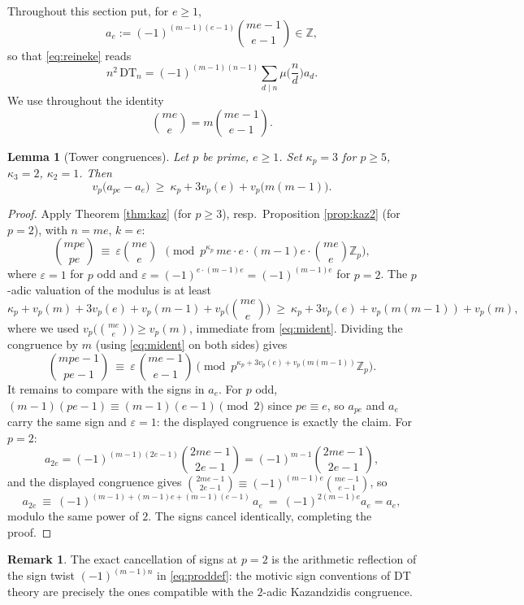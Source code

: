 \documentclass[11pt]{amsart}
\newtheorem{lemma}[theorem]{Lemma}
\theoremstyle{definition}
\newtheorem{remark}[theorem]{Remark}
\newcommand{\ZZ}{\mathbb{Z}}
\newcommand{\DT}{\mathrm{DT}}
\newcommand{\vp}{v_p}
\begin{document}
Throughout this section put, for $e\ge1$,
\[
a_e:=(-1)^{(m-1)(e-1)}\binom{me-1}{e-1}\in\ZZ,
\]
so that \eqref{eq:reineke} reads
\begin{equation}\label{eq:reineke2}
n^2\,\DT_n=(-1)^{(m-1)(n-1)}\sum_{d\mid n}\mu\Big(\frac nd\Big)a_d .
\end{equation}
We use throughout the identity
\begin{equation}\label{eq:mident}
\binom{me}{e}=m\binom{me-1}{e-1}.
\end{equation}

\begin{lemma}[Tower congruences]\label{lem:tower}
Let $p$ be prime, $e\ge1$. Set $\kappa_p=3$ for $p\ge5$, $\kappa_3=2$, $\kappa_2=1$. Then
\[
\vp\big(a_{pe}-a_e\big)\ \ge\ \kappa_p+3\vp(e)+\vp\big(m(m-1)\big).
\]
\end{lemma}

\begin{proof}
Apply Theorem \ref{thm:kaz} (for $p\ge3$), resp.\ Proposition \ref{prop:kaz2} (for $p=2$), with $n=me$, $k=e$:
\[
\binom{mpe}{pe}\ \equiv\ \varepsilon\binom{me}{e}\ \ \pmod{p^{\kappa_p}\,me\cdot e\cdot(m-1)e\cdot\binom{me}{e}\ZZ_p},
\]
where $\varepsilon=1$ for $p$ odd and $\varepsilon=(-1)^{e\cdot(m-1)e}=(-1)^{(m-1)e}$ for $p=2$. The $p$-adic valuation of the modulus is at least
\[
\kappa_p+\vp(m)+3\vp(e)+\vp(m-1)+\vp\Big(\binom{me}{e}\Big)
\ \ge\ \kappa_p+3\vp(e)+\vp(m(m-1))+\vp(m),
\]
where we used $\vp\big(\binom{me}{e}\big)\ge\vp(m)$, immediate from \eqref{eq:mident}. Dividing the congruence by $m$ (using \eqref{eq:mident} on both sides) gives
\[
\binom{mpe-1}{pe-1}\ \equiv\ \varepsilon\,\binom{me-1}{e-1}\pmod{p^{\kappa_p+3\vp(e)+\vp(m(m-1))}\ZZ_p}.
\]
It remains to compare with the signs in $a_e$. For $p$ odd, $(m-1)(pe-1)\equiv(m-1)(e-1)\pmod 2$ since $pe\equiv e$, so $a_{pe}$ and $a_e$ carry the same sign and $\varepsilon=1$: the displayed congruence is exactly the claim. For $p=2$:
\[
a_{2e}=(-1)^{(m-1)(2e-1)}\binom{2me-1}{2e-1}=(-1)^{m-1}\binom{2me-1}{2e-1},
\]
and the displayed congruence gives $\binom{2me-1}{2e-1}\equiv(-1)^{(m-1)e}\binom{me-1}{e-1}$, so
\[
a_{2e}\ \equiv\ (-1)^{(m-1)+(m-1)e+(m-1)(e-1)}\,a_e\ =\ (-1)^{2(m-1)e}a_e=a_e ,
\]
modulo the same power of $2$. The signs cancel identically, completing the proof.
\end{proof}

\begin{remark}
The exact cancellation of signs at $p=2$ is the arithmetic reflection of the sign twist $(-1)^{(m-1)n}$ in \eqref{eq:proddef}: the motivic sign conventions of DT theory are precisely the ones compatible with the $2$-adic Kazandzidis congruence.
\end{remark}
\end{document}
